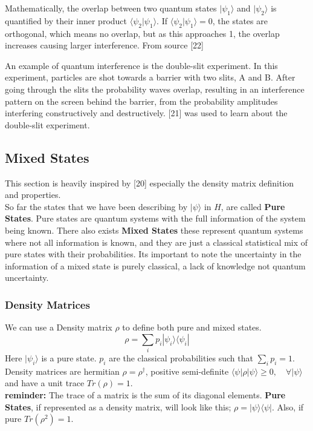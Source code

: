 \noindent Mathematically, the overlap between two quantum states \( |\psi_1\rangle \) and \( |\psi_2\rangle \) is quantified by their inner product \( \langle \psi_2 | \psi_1 \rangle \). If \( \langle \psi_2 | \psi_1 \rangle = 0 \), the states are orthogonal, which means no overlap, but as this approaches 1, the overlap increases causing larger interference. From source [22]

\noindent An example of quantum interference is the double-slit experiment. In this experiment, particles are shot towards a barrier with two slits, A and B. After going through the slits the probability waves overlap, resulting in an interference pattern on the screen behind the barrier, from the probability amplitudes interfering constructively and destructively. 
[21] was used to learn about the double-slit experiment.

\subsection{Mixed States}
This section is heavily inspired by [20] especially the density matrix definition and properties.\\
So far the states that we have been describing by \(|\psi\rangle\) in $H$, are called \textbf{Pure States}. Pure states are quantum systems with the full information of the system being known. There also exists \textbf{Mixed States} these represent quantum systems where not all information is known, and they are just a classical statistical mix of pure states with their probabilities. Its important to note the uncertainty in the information of a mixed state is purely classical, a lack of knowledge not quantum uncertainty.

\subsubsection{Density Matrices} 
We can use a Density matrix $\rho$ to define both pure and mixed states.
\begin{equation}
    \rho = \sum_i p_i|\psi_i \rangle \langle\psi_i|
\end{equation}
\noindent Here \( |\psi_i \rangle\) is a pure state. $p_i$ are the classical probabilities such that $\sum_i p_i = 1$. Density matrices are hermitian $\rho = \rho^\dagger$, positive semi-definite \(\langle \psi | \rho | \psi \rangle \geq 0, \quad \forall  |\psi\rangle\) and have a unit trace \( Tr(\rho) = 1\).\\
\textbf{reminder:} The trace of a matrix is the sum of its diagonal elements.
\noindent\textbf{Pure States}, if represented as a density matrix, will look like this; \(\rho = |\psi \rangle \langle\psi|\). Also, if pure \(Tr(\rho^2) = 1\).\\

